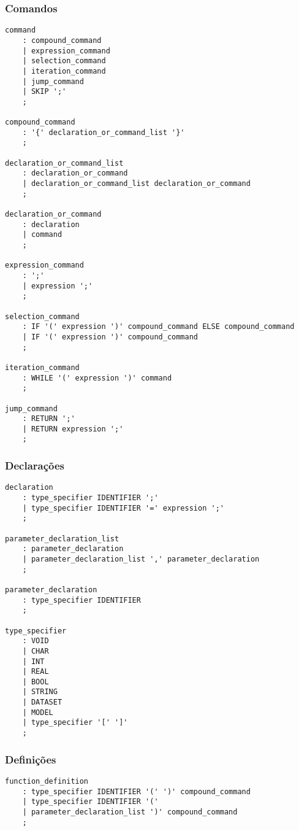\documentclass[12pt]{article}
\begin{document}
\subsubsection{Comandos}
\begin{verbatim}
command
    : compound_command
    | expression_command
    | selection_command
    | iteration_command
    | jump_command
    | SKIP ';'
    ;

compound_command
    : '{' declaration_or_command_list '}'
    ;

declaration_or_command_list 
    : declaration_or_command
    | declaration_or_command_list declaration_or_command
    ;

declaration_or_command
    : declaration
    | command
    ;

expression_command
    : ';'
    | expression ';'
    ;

selection_command
    : IF '(' expression ')' compound_command ELSE compound_command
    | IF '(' expression ')' compound_command
    ;

iteration_command
    : WHILE '(' expression ')' command
    ;

jump_command
    : RETURN ';'
    | RETURN expression ';'
    ;
\end{verbatim}

\subsubsection{Declarações}
\begin{verbatim}
declaration
    : type_specifier IDENTIFIER ';'
    | type_specifier IDENTIFIER '=' expression ';'
    ;

parameter_declaration_list
    : parameter_declaration
    | parameter_declaration_list ',' parameter_declaration
    ;

parameter_declaration
    : type_specifier IDENTIFIER
    ;

type_specifier
    : VOID
    | CHAR
    | INT
    | REAL
    | BOOL
    | STRING
    | DATASET
    | MODEL
    | type_specifier '[' ']'
    ;
\end{verbatim}

\subsubsection{Definições}
\begin{verbatim}
function_definition
    : type_specifier IDENTIFIER '(' ')' compound_command
    | type_specifier IDENTIFIER '(' 
    | parameter_declaration_list ')' compound_command
    ;
\end{verbatim}
\end{document}
